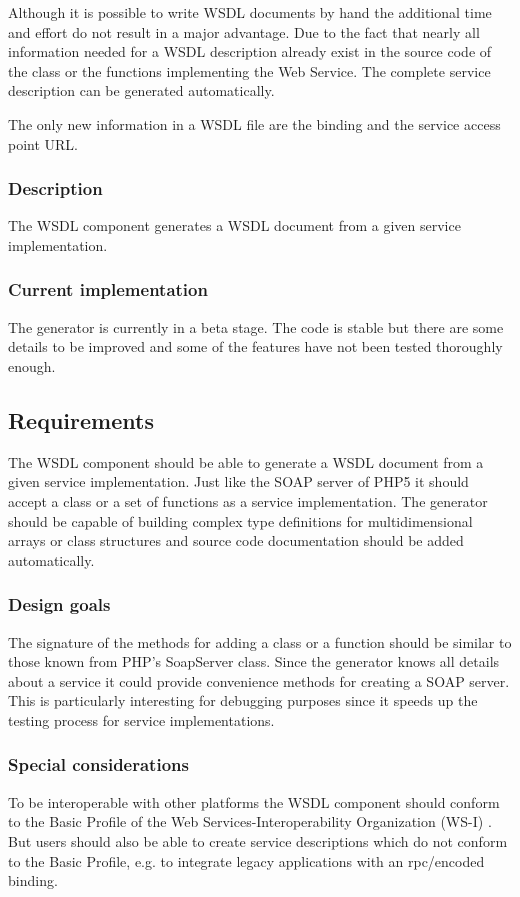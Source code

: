 \documentclass[10pt,final,a4paper,oneside]{article}
\begin{document}
Although it is possible
to write WSDL documents by hand
the additional time and effort
do not result in a major advantage.
Due to the fact that nearly all information
needed for a WSDL description already exist
in the source code of the class or the functions
implementing the Web Service.
The complete service description
can be generated automatically.

The only new information in a WSDL file
are the binding and the service access point URL.

\subsubsection{Description}
The WSDL component generates a WSDL document
from a given service implementation.

\subsubsection{Current implementation}
The generator is currently in a beta stage.
The code is stable but there are some details to be improved
and some of the features have not been tested thoroughly enough.

\subsection{Requirements}\label{subsec:WSDLRequirements}
The WSDL component should be able to generate a WSDL document
from a given service implementation.
Just like the SOAP server of PHP5 it should accept
a class or a set of functions as a service implementation.
The generator should be capable of building complex type definitions
for multidimensional arrays or class structures and source code documentation should be added
automatically.

\subsubsection{Design goals}

The signature of the methods for adding a class or a function should
be similar to those known from PHP's SoapServer class.
Since the generator knows all details about a service
it could provide convenience methods for creating a SOAP server.
This is particularly interesting for debugging purposes
since it speeds up the testing process for service implementations.

\subsubsection{Special considerations}
To be interoperable with other platforms
the WSDL component should conform
to the Basic Profile of the
Web Services-Interoperability Organization (WS-I) \cite{BasicProfile}.
But users should also be able to create service descriptions
which do not conform to the Basic Profile,
e.g. to integrate legacy applications
with an rpc/encoded binding.
\end{document}
